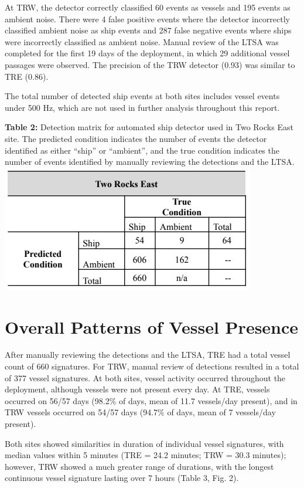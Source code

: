 \documentclass[
  letterpaper,
  oneside,
  open=any]{scrbook}
\begin{document}
At TRW, the detector correctly classified 60 events as vessels and 195
events as ambient noise. There were 4 false positive events where the
detector incorrectly classified ambient noise as ship events and 287
false negative events where ships were incorrectly classified as ambient
noise. Manual review of the LTSA was completed for the first 19 days of
the deployment, in which 29 additional vessel passages were observed.
The precision of the TRW detector (0.93) was similar to TRE (0.86).

The total number of detected ship events at both sites includes vessel
events under 500 Hz, which are not used in further analysis throughout
this report.

\textbf{Table 2:} Detection matrix for automated ship detector used in
Two Rocks East site. The predicted condition indicates the number of
events the detector identified as either ``ship'' or ``ambient'', and
the true condition indicates the number of events identified by manually
reviewing the detections and the LTSA.
\includegraphics{images/Table.2.PNG}

\section{Overall Patterns of Vessel
Presence}\label{overall-patterns-of-vessel-presence}

After manually reviewing the detections and the LTSA, TRE had a total
vessel count of 660 signatures. For TRW, manual review of detections
resulted in a total of 377 vessel signatures. At both sites, vessel
activity occurred throughout the deployment, although vessels were not
present every day. At TRE, vessels occurred on 56/57 days (98.2\% of
days, mean of 11.7 vessels/day present), and in TRW vessels occurred on
54/57 days (94.7\% of days, mean of 7 vessels/day present).

Both sites showed similarities in duration of individual vessel
signatures, with median values within 5 minutes (TRE = 24.2 minutes; TRW
= 30.3 minutes); however, TRW showed a much greater range of durations,
with the longest continuous vessel signature lasting over 7 hours (Table
3, Fig. 2).
\end{document}
